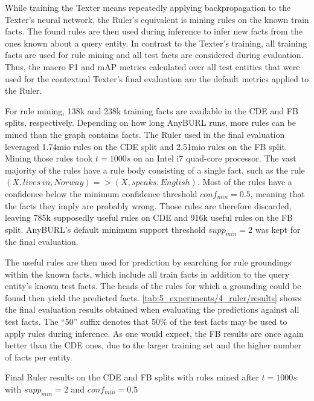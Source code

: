 While training the Texter means repeatedly applying backpropagation to the Texter's neural network, the Ruler's equivalent is mining rules on the known train facts. The found rules are then used during inference to infer new facts from the ones known about a query entity. In contrast to the Texter's training, all training facts are used for rule mining and all test facts are considered during evaluation. Thus, the macro F1 and mAP metrics calculated over all test entities that were used for the contextual Texter's final evaluation are the default metrics applied to the Ruler.

For rule mining, 138k and 238k training facts are available in the CDE and FB splits, respectively. Depending on how long AnyBURL runs, more rules can be mined than the graph contains facts. The Ruler used in the final evaluation leveraged 1.74mio rules on the CDE split and 2.51mio rules on the FB split. Mining those rules took $t = 1000s$ on an Intel i7 quad-core processor. The vast majority of the rules have a rule body consisting of a single fact, such as the rule $(X, lives~in, Norway) => (X, speaks, English)$. Most of the rules have a confidence below the minimum confidence threshold $conf_{min} = 0.5$, meaning that the facts they imply are probably wrong. Those rules are therefore discarded, leaving 785k supposedly useful rules on CDE and 916k useful rules on the FB split. AnyBURL's default minimum support threshold $supp_{min} = 2$ was kept for the final evaluation.

The useful rules are then used for prediction by searching for rule groundings within the known facts, which include all train facts in addition to the query entity's known test facts. The heads of the rules for which a grounding could be found then yield the predicted facts. \autoref{tab:5_experiments/4_ruler/results} shows the final evaluation results obtained when evaluating the predictions against all test facts. The ``50'' suffix denotes that 50\% of the test facts may be used to apply rules during inference. As one would expect, the FB results are once again better than the CDE ones, due to the larger training set and the higher number of facts per entity.

\begin{table}[h]
    \makebox[\textwidth][c]{
        
    }
    \caption{Final Ruler results on the CDE and FB splits with rules mined after $t = 1000s$ with $supp_{min} = 2$ and $conf_{min} = 0.5$}
    \label{tab:5_experiments/4_ruler/results}
\end{table}

